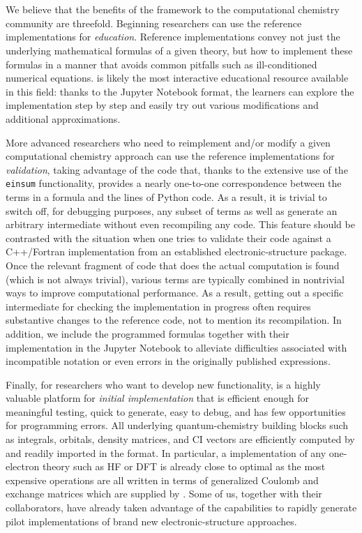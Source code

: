 \section{}

We believe that the benefits of the \pfn framework to the computational chemistry community are threefold.  Beginning researchers can use the \pfn reference implementations for \emph{education}. Reference implementations convey not just the underlying mathematical formulas of a given theory, but how to implement these formulas in a manner that avoids common pitfalls such as ill-conditioned numerical equations. \pfn is likely the most interactive educational resource available in this field: thanks to the Jupyter Notebook format, the learners can explore the implementation step by step and easily try out various modifications and additional approximations.

More advanced researchers who need to reimplement and/or modify a given computational chemistry approach can use the \pfn reference implementations for \emph{validation}, taking advantage of the code that, thanks to the extensive use of the \numpy \texttt{einsum} functionality, provides a nearly one-to-one correspondence between the terms in a formula and the lines of Python code. As a result, it is trivial to switch off, for debugging purposes, any subset of terms as well as generate an arbitrary intermediate without even recompiling any code.  This feature should be contrasted with the situation when one tries to validate their code against a C++/Fortran implementation from an established electronic-structure package. Once the relevant fragment of code that does the actual computation is found (which is not always trivial), various terms are typically combined in nontrivial ways to improve computational performance. As a result, getting out a specific intermediate for checking the implementation in progress often requires substantive changes to the reference code, not to mention its recompilation.  In addition, we include the programmed formulas together with their implementation in the Jupyter Notebook to alleviate difficulties associated with incompatible notation or even errors in the originally published expressions.

Finally, for researchers who want to develop new functionality, \pfn is a highly valuable platform for \emph{initial implementation} that is efficient enough for meaningful testing, quick to generate, easy to debug, and has few opportunities for programming errors. All underlying quantum-chemistry building blocks such as integrals, orbitals, density matrices, and CI vectors are efficiently computed by \pfour and readily imported in the \numpy format. In particular, a \pfn implementation of any one-electron theory such as HF or DFT is already close to optimal as the most expensive operations are all written in terms of generalized Coulomb and exchange matrices which are supplied by \pfour.  Some of us, together with their collaborators, have already taken advantage of the \pfn capabilities to rapidly generate pilot implementations of brand new electronic-structure approaches.

